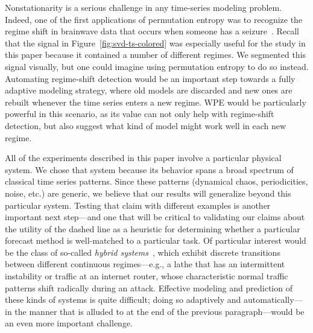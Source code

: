 Nonstationarity is a serious challenge in any time-series modeling
problem.  Indeed, one of the first applications of permutation entropy
was to recognize the regime shift in brainwave data that occurs when
someone has a seizure~\cite{cao2004det}.  Recall that the signal in
Figure~\ref{fig:svd-ts-colored} was especially useful for the study in
this paper because it contained a number of different regimes.  We
segmented this signal visually, but one could imagine using
permutation entropy to do so instead.  Automating regime-shift
detection would be an important step towards a fully adaptive modeling
strategy, where old models are discarded and new ones are rebuilt
whenever the time series enters a new regime.  WPE would be
particularly powerful in this scenario, as its value can not only help
with regime-shift detection, but also suggest what kind of model might
work well in each new regime.

All of the experiments described in this paper involve a particular
physical system.  We chose that system because its behavior spans a
broad spectrum of classical time series patterns.  Since these
patterns (dynamical chaos, periodicities, noise, etc.) are generic, we
believe that our results will generalize beyond this particular
system.  Testing that claim with different examples is another
important next step---and one that will be critical to validating our
claims about the utility of the dashed line as a heuristic for
determining whether a particular forecast method is well-matched to a
particular task.  Of particular interest would be the class of
so-called \emph{hybrid systems}~\cite{hybrid}, which exhibit discrete transitions
between different continuous regimes---e.g., a lathe that has an
intermittent instability or traffic at an internet router, whose
characteristic normal traffic patterns shift radically during an
attack.  Effective modeling and prediction of these kinds of systems
is quite difficult; doing so adaptively and automatically---in the
manner that is alluded to at the end of the previous paragraph---would
be an even more important challenge.

